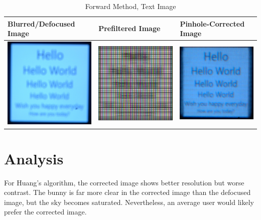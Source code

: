 \begin{table}
    \caption {Forward Method, Text Image}
    \begin{tabular}{| l | l | l |}
    \hline Blurred/Defocused Image & Prefiltered Image & Pinhole-Corrected Image \\ \hline
      \includegraphics[width=1.9in]{chapters/chapter5/images/Shichao_Words_380_250_Origin.JPG} &
      \includegraphics[width=1.9in]{chapters/chapter5/images/Shichao_word_Prefiltered.png} &
      \includegraphics[width=1.9in]{chapters/chapter5/images/Shichao_Words_380_250_Pinhole.JPG} \\ \hline
    \end{tabular}
\end{table} 

\newpage
\section{Analysis}

For Huang’s algorithm, the corrected image shows better resolution but worse contrast. The bunny is far more clear in the corrected image than the defocused image, but the sky becomes saturated. Nevertheless, an average user would likely prefer the corrected image. 

